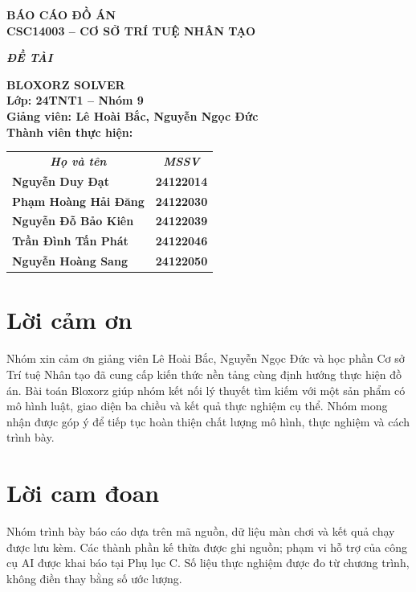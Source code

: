 \documentclass[a4paper]{article}
\newcommand{\frontmatterheading}[1]{\section*{#1}}
\begin{document}
\begin{titlepage}
\begin{center}
{\fontsize{18pt}{22pt}\selectfont\textbf{BÁO CÁO ĐỒ ÁN}}\\[7pt]
{\fontsize{18pt}{22pt}\selectfont\textbf{CSC14003 -- CƠ SỞ TRÍ TUỆ NHÂN TẠO}}
\end{center}
\begin{flushleft}
\fontsize{14pt}{17pt}\selectfont\textbf{\textsl{ĐỀ TÀI}}
\end{flushleft}
\begin{center}
{\fontsize{24pt}{28pt}\selectfont\textbf{BLOXORZ SOLVER}}\\[12pt]
{\fontsize{18pt}{22pt}\selectfont\textbf{Lớp: 24TNT1 -- Nhóm 9}}\\[10pt]
\textbf{Giảng viên: Lê Hoài Bắc, Nguyễn Ngọc Đức}\\[14pt]
{\fontsize{18pt}{22pt}\selectfont\textbf{Thành viên thực hiện:}}\\[12pt]
\begin{tabular}{l @{\hspace{2cm}} c}
\multicolumn{1}{c}{\textbf{\textit{Họ và tên}}} & \textbf{\textit{MSSV}}\\[0.35cm]
\textbf{Nguyễn Duy Đạt} & \textbf{24122014}\\
\textbf{Phạm Hoàng Hải Đăng} & \textbf{24122030}\\
\textbf{Nguyễn Đỗ Bảo Kiên} & \textbf{24122039}\\
\textbf{Trần Đình Tấn Phát} & \textbf{24122046}\\
\textbf{Nguyễn Hoàng Sang} & \textbf{24122050}\\
\end{tabular}
\vfill
\end{center}
\end{titlepage}
\hypersetup{pageanchor=true}

\begingroup
\singlespacing
\tableofcontents
\endgroup
\newpage

\frontmatterheading{Lời cảm ơn}
Nhóm xin cảm ơn giảng viên Lê Hoài Bắc, Nguyễn Ngọc Đức và học phần Cơ sở Trí tuệ Nhân tạo đã cung cấp kiến thức nền tảng cùng định hướng thực hiện đồ án. Bài toán Bloxorz giúp nhóm kết nối lý thuyết tìm kiếm với một sản phẩm có mô hình luật, giao diện ba chiều và kết quả thực nghiệm cụ thể. Nhóm mong nhận được góp ý để tiếp tục hoàn thiện chất lượng mô hình, thực nghiệm và cách trình bày.

\frontmatterheading{Lời cam đoan}
Nhóm trình bày báo cáo dựa trên mã nguồn, dữ liệu màn chơi và kết quả chạy được lưu kèm. Các thành phần kế thừa được ghi nguồn; phạm vi hỗ trợ của công cụ AI được khai báo tại Phụ lục C. Số liệu thực nghiệm được đo từ chương trình, không điền thay bằng số ước lượng. 
\end{document}
